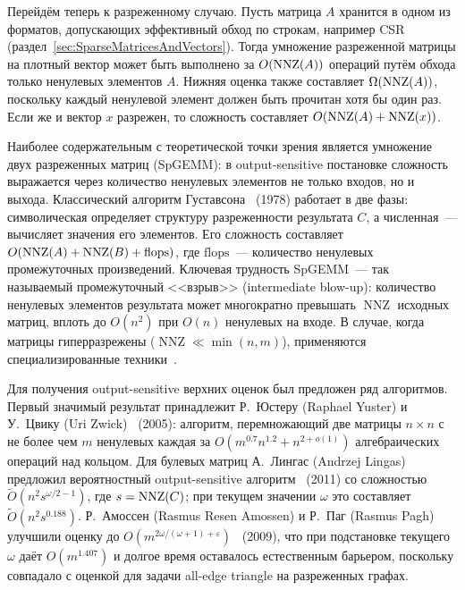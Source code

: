 Перейдём теперь к разреженному случаю.
Пусть матрица $A$ хранится в одном из форматов, допускающих эффективный обход по строкам, например CSR (раздел~\ref{sec:SparseMatricesAndVectors}).
Тогда умножение разреженной матрицы на плотный вектор может быть выполнено за $O(\operatorname{NNZ}(A))$ операций путём обхода только ненулевых элементов $A$.
Нижняя оценка также составляет $\Omega(\operatorname{NNZ}(A))$, поскольку каждый ненулевой элемент должен быть прочитан хотя бы один раз.
Если же и вектор $x$ разрежен, то сложность составляет $O(\operatorname{NNZ}(A) + \operatorname{NNZ}(x))$.

Наиболее содержательным с теоретической точки зрения является умножение двух разреженных матриц (SpGEMM): в output-sensitive постановке сложность выражается через количество ненулевых элементов не только входов, но и выхода.
Классический алгоритм Густавсона~ (1978) работает в две фазы: символическая определяет структуру разреженности результата $C$, а численная~--- вычисляет значения его элементов.
Его сложность составляет $O(\operatorname{NNZ}(A) + \operatorname{NNZ}(B) + \text{flops})$, где $\text{flops}$~--- количество ненулевых промежуточных произведений.
Ключевая трудность SpGEMM~--- так называемый промежуточный <<взрыв>> (intermediate blow-up): количество ненулевых элементов результата может многократно превышать $\operatorname{NNZ}$ исходных матриц, вплоть до $O(n^2)$ при $O(n)$ ненулевых на входе.
В случае, когда матрицы гиперразрежены ($\operatorname{NNZ} \ll \min(n,m)$), применяются специализированные техники~.

Для получения output-sensitive верхних оценок был предложен ряд алгоритмов.
Первый значимый результат принадлежит Р.~Юстеру (Raphael Yuster) и У.~Цвику (Uri Zwick)~ (2005): алгоритм, перемножающий две матрицы $n \times n$ с не более чем $m$ ненулевых каждая за $O(m^{0.7} n^{1.2} + n^{2+o(1)})$ алгебраических операций над кольцом.
Для булевых матриц А.~Лингас (Andrzej Lingas) предложил вероятностный output-sensitive алгоритм~ (2011) со сложностью $\tilde{O}(n^2 s^{\omega/2-1})$, где $s = \operatorname{NNZ}(C)$; при текущем значении $\omega$ это составляет $\tilde{O}(n^2 s^{0.188})$.
Р.~Амоссен (Rasmus Resen Amossen) и Р.~Паг (Rasmus Pagh) улучшили оценку до $O(m^{2\omega/(\omega+1)+\varepsilon})$~ (2009), что при подстановке текущего $\omega$ даёт $O(m^{1.407})$ и долгое время оставалось естественным барьером, поскольку совпадало с оценкой для задачи all-edge triangle на разреженных графах.


